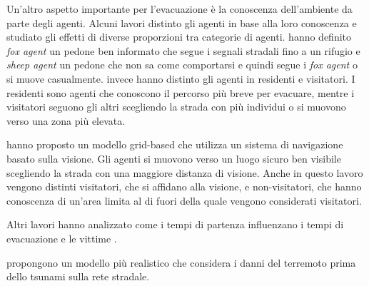Un'altro aspetto importante per l'evacuazione è la conoscenza dell'ambiente da parte degli agenti.
Alcuni lavori distinto gli agenti in base alla loro conoscenza e
studiato gli effetti di diverse proporzioni tra categorie di agenti.
\textcite{nguyen2012simulation} hanno definito \textit{fox agent} un pedone ben informato che segue i segnali
stradali fino a un rifugio e \textit{sheep agent} un pedone che non sa
come comportarsi e quindi segue i \textit{fox agent} o si muove casualmente.
\textcite{takabatake2017simulated} invece hanno distinto gli agenti in residenti e visitatori.
I residenti sono agenti che conoscono il percorso più breve per evacuare, mentre i visitatori
seguono gli altri scegliendo la strada con più individui o si muovono verso una zona più elevata.

\textbf{\textcite{mas2012agent}}

\textcite{wijerathne2013hpc} hanno proposto un modello grid-based che utilizza un sistema di navigazione basato
sulla visione. Gli agenti si muovono verso un luogo sicuro ben visibile scegliendo la strada con una maggiore distanza di visione.
%
Anche in questo lavoro vengono distinti visitatori, che si affidano alla visione, e non-visitatori, che hanno conoscenza di un'area
limita al di fuori della quale vengono considerati visitatori.


Altri lavori hanno analizzato come i tempi di partenza influenzano i tempi di evacuazione e le vittime
\textbf{\textcite{wang2016agent}}.

\textbf{\textcite{wang2021novel}} propongono un modello più realistico che considera i danni del terremoto
prima dello tsunami sulla rete stradale.
